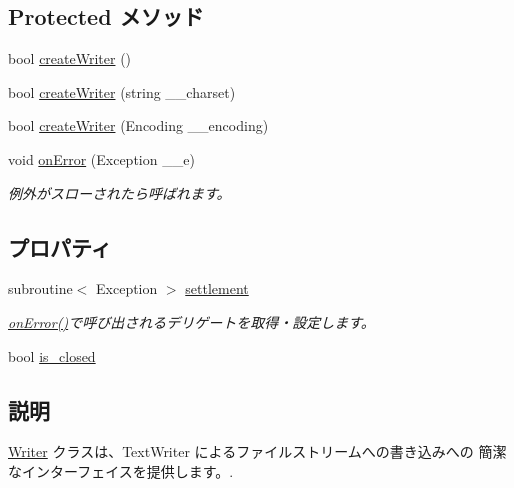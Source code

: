 \subsection*{Protected メソッド}
\begin{DoxyCompactItemize}
\item 
bool \hyperlink{classlazurite_1_1util_1_1_writer_a03a0e9029a3c2700eb539d3fb3ad1f80}{createWriter} ()
\item 
bool \hyperlink{classlazurite_1_1util_1_1_writer_a78a3a05c40f8e22dc3f2f7bf5dc78dbf}{createWriter} (string \_\-\_\-charset)
\item 
bool \hyperlink{classlazurite_1_1util_1_1_writer_aedfaa1434267419700f66c319d7cc9d1}{createWriter} (Encoding \_\-\_\-encoding)
\item 
void \hyperlink{classlazurite_1_1util_1_1_writer_ae0505d0da349d6009401b33e55b08bc4}{onError} (Exception \_\-\_\-e)
\begin{DoxyCompactList}\small\item\em 例外がスローされたら呼ばれます。 \item\end{DoxyCompactList}\end{DoxyCompactItemize}
\subsection*{プロパティ}
\begin{DoxyCompactItemize}
\item 
subroutine$<$ Exception $>$ \hyperlink{classlazurite_1_1util_1_1_writer_a2a39a19e6fb9262f37b27be31b5a45c3}{settlement}
\begin{DoxyCompactList}\small\item\em \hyperlink{classlazurite_1_1util_1_1_writer_ae0505d0da349d6009401b33e55b08bc4}{onError()}で呼び出されるデリゲートを取得・設定します。 \item\end{DoxyCompactList}\item 
bool \hyperlink{classlazurite_1_1util_1_1_writer_aad2ddbf9b2441adcdb7913e6cd85fe46}{is\_\-closed}
\end{DoxyCompactItemize}


\subsection{説明}
\hyperlink{classlazurite_1_1util_1_1_writer}{Writer} クラスは、TextWriter によるファイルストリームへの書き込みへの 簡潔なインターフェイスを提供します。. 

